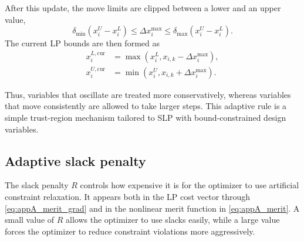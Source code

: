 \documentclass[11pt,a4paper]{article}
\begin{document}
After this update, the move limits are clipped between a lower and an
upper value,
\begin{equation}
\label{eq:appA_move_bounds}
    \delta_{\min}(x_i^U-x_i^L)
    \leq
    \Delta x_i^{\max}
    \leq
    \delta_{\max}(x_i^U-x_i^L).
\end{equation}
The current LP bounds are then formed as
\begin{equation}
\label{eq:appA_current_bounds}
\begin{aligned}
    x_i^{L,\mathrm{cur}}
    &=
    \max\left(x_i^L, x_{i,k}-\Delta x_i^{\max}\right),
    \\
    x_i^{U,\mathrm{cur}}
    &=
    \min\left(x_i^U, x_{i,k}+\Delta x_i^{\max}\right).
\end{aligned}
\end{equation}

Thus, variables that oscillate are treated more conservatively,
whereas variables that move consistently are allowed to take larger
steps. This adaptive rule is a simple trust-region mechanism tailored
to SLP with bound-constrained design variables.

\subsection{Adaptive slack penalty}
\label{sec:slpA:penalty}

The slack penalty $R$ controls how expensive it is for the optimizer
to use artificial constraint relaxation. It appears both in the LP
cost vector through \autoref{eq:appA_merit_grad} and in the nonlinear
merit function in \autoref{eq:appA_merit}. A small value of $R$
allows the optimizer to use slacks easily, while a large value forces
the optimizer to reduce constraint violations more aggressively.
\end{document}
